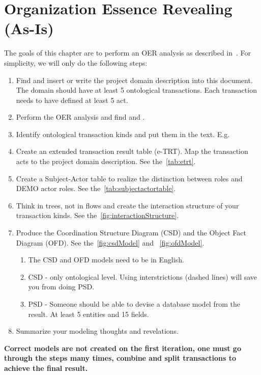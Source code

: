 \chapter{Organization Essence Revealing (As-Is)}

The goals of this chapter are to perform an OER analysis as described in~\cite{dietz2015teoo,dietz2020enterprise}. For simplicity, we will only do the following steps: 

\begin{enumerate}
    \item Find and insert or write the project domain description into this document. The domain should have at least 5 ontological transactions. Each transaction needs to have defined at least 5 act. 
    \item Perform the OER analysis and find  and . 
    \item Identify ontological transaction kinds and put them in the text. E.g. \oact{[TK1/rq]} 
    \item Create an extended transaction result table (e-TRT). Map the transaction acts to the project domain description. See the~\cref{tab:etrt}. 
    \item Create a Subject-Actor table to realize the distinction between roles and DEMO actor roles. See the~\cref{tab:subjectactortable}. 
    \item Think in trees, not in flows and create the interaction structure of your transaction kinds. See the~\cref{fig:interactionStructure}.  
    \item Produce the Coordination Structure Diagram (CSD) and the Object Fact Diagram (OFD). See the~\cref{fig:csdModel} and ~\cref{fig:ofdModel}.  
    \begin{enumerate}
        \item The CSD and OFD models need to be in English.
        \item CSD - only ontological level. Using interstrictions (dashed lines) will save you from doing PSD. 
        \item PSD - Someone should be able to devise a database model from the result. At least 5 entities and 15 fields. 
    \end{enumerate}
    \item Summarize your modeling thoughts and revelations. 
\end{enumerate}

\textbf{Correct models are not created on the first iteration, one must go through the steps many times, combine and split transactions to achieve the final result. }


